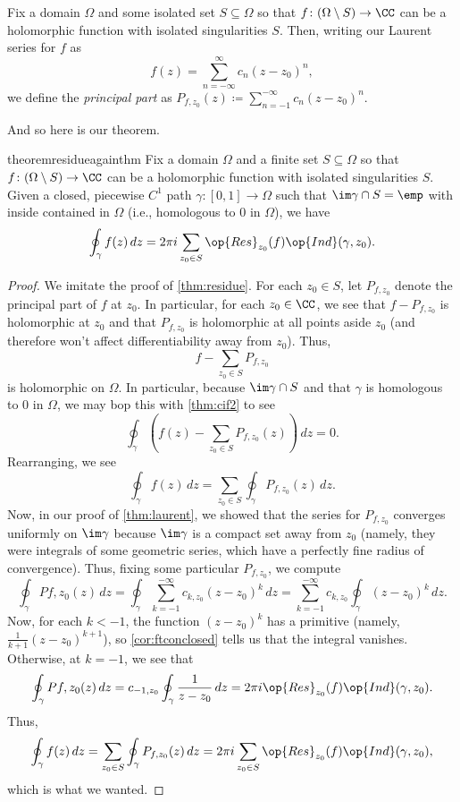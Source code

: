 \begin{definition}[Residue]
	Fix a domain $\Omega$ and some isolated set $S\subseteq\Omega$ so that $f\colon(\Omega\setminus S)\to\CC$ can be a holomorphic function with isolated singularities $S$. Then, writing our Laurent series for $f$ as
	\[f(z)=\sum_{n=-\infty}^\infty c_n(z-z_0)^n,\]
	we define the \textit{principal part} as $P_{f,z_0}(z)\coloneqq \sum_{n=-1}^{-\infty} c_n(z-z_0)^n$.
\end{definition}
And so here is our theorem.
\begin{restatable}[Residue]{theorem}{residueagainthm} \label{thm:residue2}
	Fix a domain $\Omega$ and a finite set $S\subseteq\Omega$ so that $f\colon(\Omega\setminus S)\to\CC$ can be a holomorphic function with isolated singularities $S$. Given a closed, piecewise $C^1$ path $\gamma\colon[0,1]\to\Omega$ such that $\im\gamma\cap S=\emp$ with inside contained in $\Omega$ (i.e., homologous to $0$ in $\Omega$), we have
	\[\oint_\gamma f(z)\,dz=2\pi i\sum_{z_0\in S}\op{Res}_{z_0}(f)\op{Ind}(\gamma,z_0).\]
\end{restatable}
\begin{proof}
	We imitate the proof of \autoref{thm:residue}. For each $z_0\in S$, let $P_{f,z_0}$ denote the principal part of $f$ at $z_0$. In particular, for each $z_0\in\CC$, we see that $f-P_{f,z_0}$ is holomorphic at $z_0$ and that $P_{f,z_0}$ is holomorphic at all points aside $z_0$ (and therefore won't affect differentiability away from $z_0$). Thus,
	\[f-\sum_{z_0\in S}P_{f,z_0}\]
	is holomorphic on $\Omega$. In particular, because $\im\gamma\cap S$ and that $\gamma$ is homologous to $0$ in $\Omega$, we may bop this with \autoref{thm:cif2} to see
	\[\oint_\gamma\left(f(z)-\sum_{z_0\in S}P_{f,z_0}(z)\right)\,dz=0.\]
	Rearranging, we see
	\[\oint_\gamma f(z)\,dz=\sum_{z_0\in S}\oint_\gamma P_{f,z_0}(z)\,dz.\]
	Now, in our proof of \autoref{thm:laurent}, we showed that the series for $P_{f,z_0}$ converges uniformly on $\im\gamma$ because $\im\gamma$ is a compact set away from $z_0$ (namely, they were integrals of some geometric series, which have a perfectly fine radius of convergence). Thus, fixing some particular $P_{f,z_0}$, we compute
	\[\oint_\gamma P{f,z_0}(z)\,dz = \oint_\gamma\sum_{k=-1}^{-\infty}c_{k,z_0}(z-z_0)^k\,dz = \sum_{k=-1}^{-\infty}c_{k,z_0}\oint_\gamma (z-z_0)^k\,dz.\]
	Now, for each $k<-1$, the function $(z-z_0)^k$ has a primitive (namely, $\frac1{k+1}(z-z_0)^{k+1}$), so \autoref{cor:ftconclosed} tells us that the integral vanishes. Otherwise, at $k=-1$, we see that
	\[\oint_\gamma P{f,z_0}(z)\,dz = c_{-1,z_0}\oint_\gamma\frac1{z-z_0}\,dz=2\pi i\op{Res}_{z_0}(f)\op{Ind}(\gamma,z_0).\]
	Thus,
	\[\oint_\gamma f(z)\,dz=\sum_{z_0\in S}\oint_\gamma P_{f,z_0}(z)\,dz=2\pi  i\sum_{z_0\in S}\op{Res}_{z_0}(f)\op{Ind}(\gamma,z_0),\]
	which is what we wanted.
\end{proof}

